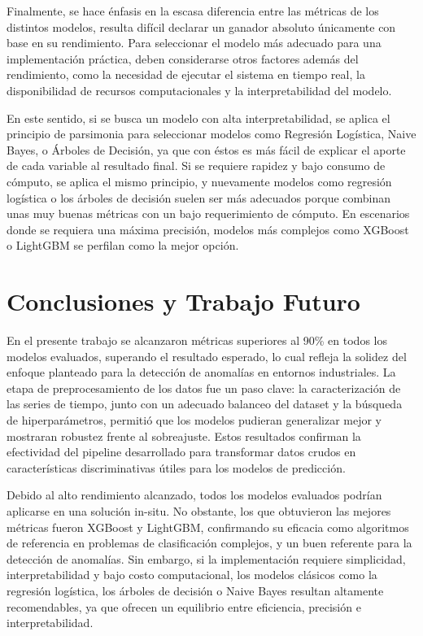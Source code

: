 \documentclass[11pt,a4paper,spanish]{book}
\numberwithin{equation}{chapter}
\numberwithin{figure}{chapter}
\begin{document}
Finalmente, se hace énfasis en la escasa diferencia entre las métricas de los distintos
modelos, resulta difícil declarar un ganador absoluto únicamente con base en su 
rendimiento. 
Para seleccionar el modelo más adecuado para una implementación práctica, deben 
considerarse otros factores además del rendimiento, como la necesidad de ejecutar el 
sistema en tiempo real, la disponibilidad de recursos computacionales y la 
interpretabilidad del modelo. 


En este sentido,  si se busca un modelo con alta interpretabilidad, se aplica el 
principio de parsimonia para seleccionar modelos como Regresión Logística, Naive Bayes,
o Árboles de Decisión, ya que con éstos es  más fácil de explicar el aporte de cada 
variable al  resultado final.  
Si se requiere rapidez y bajo consumo de cómputo, se aplica el mismo principio, y 
nuevamente modelos como regresión logística o los árboles de decisión suelen ser más 
adecuados porque combinan unas muy buenas métricas con un bajo requerimiento de cómputo.
En escenarios donde se requiera una máxima precisión, modelos más complejos como 
XGBoost o LightGBM se perfilan como la mejor opción.



\chapter{Conclusiones y Trabajo Futuro}

En el presente  trabajo se alcanzaron métricas superiores al 90\% en todos los modelos
evaluados, superando el resultado esperado, lo cual refleja la solidez del enfoque 
planteado para la detección de anomalías en entornos industriales. La etapa de 
preprocesamiento de los datos fue un paso clave: la caracterización de las series de 
tiempo, junto con un adecuado balanceo del dataset y la búsqueda de hiperparámetros, 
permitió que los modelos pudieran generalizar mejor y mostraran robustez frente al 
sobreajuste. Estos resultados confirman la efectividad del pipeline desarrollado para 
transformar datos crudos en características discriminativas útiles para los modelos 
de predicción.


Debido al alto rendimiento alcanzado, todos los modelos evaluados podrían aplicarse en 
una solución in-situ. No obstante, los que obtuvieron las mejores métricas fueron 
XGBoost y LightGBM, confirmando su eficacia como algoritmos de referencia en problemas
de clasificación complejos, y un buen referente para la detección de anomalías. Sin 
embargo, si la implementación requiere simplicidad, interpretabilidad y bajo costo 
computacional, los modelos clásicos como la regresión logística, los árboles de decisión
o Naive Bayes resultan altamente recomendables, ya que ofrecen un equilibrio entre 
eficiencia, precisión e interpretabilidad.
\end{document}

